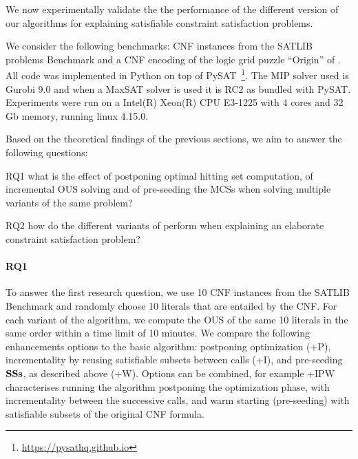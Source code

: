 We now experimentally validate the the performance of the different version of our algorithms for explaining satisfiable constraint satisfaction problems.

We consider the following benchmarks: CNF instances from the SATLIB problems Benchmark \cite{hoos2000satlib} and a CNF encoding of the logic grid puzzle ``Origin'' of \citet{ecai/BogaertsGCG20}. All code was implemented in Python on top of %
PySAT~\footnote{\url{https://pysathq.github.io}}. The MIP solver used is Gurobi 9.0 and when a MaxSAT solver is used it is RC2 as bundled with PySAT. Experiments were run on a Intel(R) Xeon(R) CPU E3-1225 with 4 cores and 32 Gb memory, running linux 4.15.0.

Based on the theoretical findings of the previous sections, we aim to answer the following questions:
\begin{compactdesc}
\item[RQ1] what is the effect of postponing optimal hitting set computation, of incremental OUS solving and of pre-seeding the MCSs when solving multiple variants of the same problem?
\item[RQ2] how do the different variants of \omus perform when explaining an elaborate constraint satisfaction problem?
\end{compactdesc}


\paragraph{RQ1}
To answer the first research question, we use 10 CNF instances from the SATLIB Benchmark and randomly choose 10 literals that are entailed by the CNF. For each variant of the algorithm, we compute the OUS of the same 10 literals in the same order within a time limit of 10 minutes. 
We compare the following enhancements options to the basic \omus algorithm: postponing optimization (+P), incrementality by reusing satisfiable subsets between \omus calls (+I), and pre-seeding $\mathbf{SSs}$, as described above (+W). Options can be combined, for example \omus+IPW characterises running the \omus algorithm postponing the optimization phase, with incrementality between the successive calls, and warm starting (pre-seeding) with satisfiable subsets of the original CNF formula.

